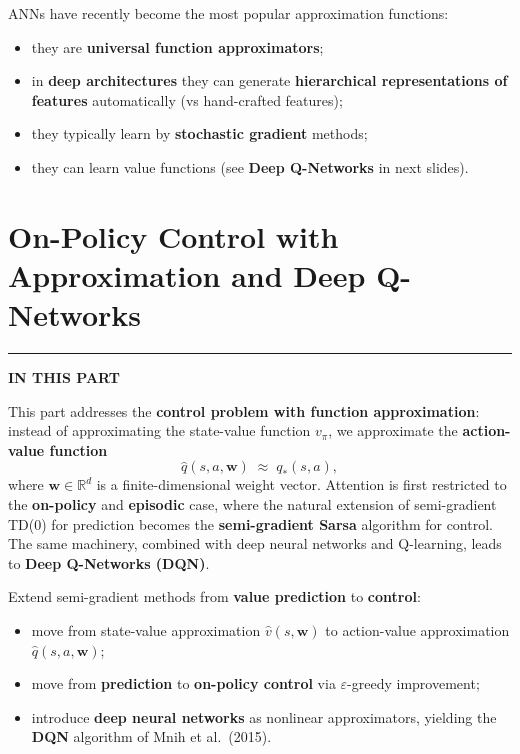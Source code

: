 \documentclass[11pt,a4paper]{article}
\theoremstyle{definition}
\theoremstyle{plain}
\theoremstyle{remark}
\newcommand{\partmtoc}{%
  \vspace{2pt}%
  {\color{rlrule}\rule{\linewidth}{0.5pt}}\par\vspace{3pt}%
  {\footnotesize\bfseries\color{rlaccent}IN THIS PART}\par\vspace{2pt}%
  \begingroup
  \etocsetnexttocdepth{subsection}%
  \localtableofcontents
  \endgroup
  \vspace{2pt}{\color{rlrule}\rule{\linewidth}{0.5pt}}\par\vspace{10pt}}
\begin{document}
\begin{tcolorbox}[colback=blue!5!white, colframe=blue!60!black, title={Artificial Neural Networks}]
ANNs have recently become the most popular approximation functions:
\begin{itemize}
    \item they are \textbf{universal function approximators};
    \item in \textbf{deep architectures} they can generate \textbf{hierarchical representations of features} automatically (vs hand-crafted features);
    \item they typically learn by \textbf{stochastic gradient} methods;
    \item they can learn value functions (see \textbf{Deep Q-Networks} in next slides).
\end{itemize}
\end{tcolorbox}

\part{On-Policy Control with Approximation and Deep Q-Networks}
\partmtoc

This part addresses the \textbf{control problem with function approximation}: instead of approximating the state-value function $v_\pi$, we approximate the \textbf{action-value function}
\[
    \hat{q}(s, a, \mathbf{w}) \;\approx\; q_*(s, a),
\]
where $\mathbf{w} \in \mathbb{R}^d$ is a finite-dimensional weight vector. Attention is first restricted to the \textbf{on-policy} and \textbf{episodic} case, where the natural extension of semi-gradient TD(0) for prediction becomes the \textbf{semi-gradient Sarsa} algorithm for control. The same machinery, combined with deep neural networks and Q-learning, leads to \textbf{Deep Q-Networks (DQN)}.

\begin{tcolorbox}[colback=blue!5!white, colframe=blue!60!black, title={Goal of this Lecture}]
Extend semi-gradient methods from \textbf{value prediction} to \textbf{control}:
\begin{itemize}
    \item move from state-value approximation $\hat{v}(s, \mathbf{w})$ to action-value approximation $\hat{q}(s, a, \mathbf{w})$;
    \item move from \textbf{prediction} to \textbf{on-policy control} via $\varepsilon$-greedy improvement;
    \item introduce \textbf{deep neural networks} as nonlinear approximators, yielding the \textbf{DQN} algorithm of Mnih et al.\ (2015).
\end{itemize}
\end{tcolorbox}
\end{document}
